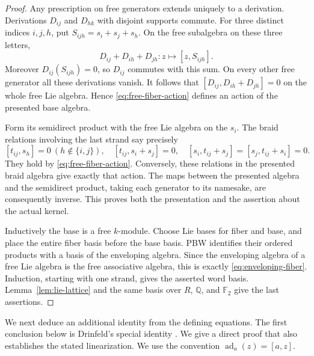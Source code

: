 \documentclass[11pt]{article}
\newcommand{\Q}{\mathbb Q}
\newcommand{\F}{{\mathbb F_2}}
\DeclareMathOperator{\ad}{ad}
\theoremstyle{definition}
\theoremstyle{remark}
\numberwithin{equation}{section}
\begin{document}
\begin{proof}
Any prescription on free generators extends uniquely to a derivation.
Derivations \(D_{ij}\) and \(D_{hk}\) with disjoint supports commute.
For three distinct indices \(i,j,h\), put
\(S_{ijh}=s_i+s_j+s_h\).  On the free subalgebra on these three letters,
\[
 D_{ij}+D_{ih}+D_{jh}:z\longmapsto[z,S_{ijh}].
\]
Moreover \(D_{ij}(S_{ijh})=0\), so \(D_{ij}\) commutes with this sum.
On every other free generator all these derivations vanish.  It
follows that \([D_{ij},D_{ih}+D_{jh}]=0\) on the whole free Lie
algebra.  Hence \eqref{eq:free-fiber-action} defines an action of the
presented base algebra.

Form its semidirect product with the free Lie algebra on the \(s_i\).
The braid relations involving the last strand say precisely
\[
 [t_{ij},s_h]=0\ (h\notin\{i,j\}),\quad
 [t_{ij},s_i+s_j]=0,\quad
 [s_i,t_{ij}+s_j]=[s_j,t_{ij}+s_i]=0.
\]
They hold by \eqref{eq:free-fiber-action}.  Conversely, these relations
in the presented braid algebra give exactly that action.  The maps
between the presented algebra and the semidirect product, taking each
generator to its namesake, are consequently inverse.  This proves
both the presentation and the assertion about the actual kernel.

Inductively the base is a free \(k\)-module.  Choose Lie bases for
fiber and base, and place the entire fiber basis before the base
basis.  PBW identifies their ordered products with a basis of the
enveloping algebra.  Since the enveloping algebra of a free Lie
algebra is the free associative algebra, this is exactly
\eqref{eq:enveloping-fiber}.  Induction, starting with one strand,
gives the asserted word basis.  Lemma~\ref{lem:lie-lattice} and the
same basis over \(R\), \(\Q\), and \(\F\) give the last assertions.
\end{proof}

We next deduce an additional identity from the defining equations.
The first conclusion below is Drinfeld's special identity
\cite[Proposition~5.7]{Drinfeld}.  We give a direct proof that also
establishes the stated linearization.  We use the convention
\(\ad_a(z)=[a,z]\).
\end{document}
